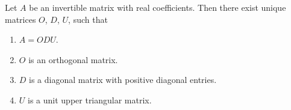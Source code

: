 \documentclass[12pt]{article}
\begin{document}
Let $A$ be an invertible matrix with real coefficients. Then there exist unique matrices $O$, $D$, $U$, such that
\begin{enumerate}
\item $A=ODU$.
\item $O$ is an orthogonal matrix.
\item $D$ is a diagonal matrix with positive diagonal entries.
\item $U$ is a unit upper triangular matrix.
\end{enumerate}
\end{document}
